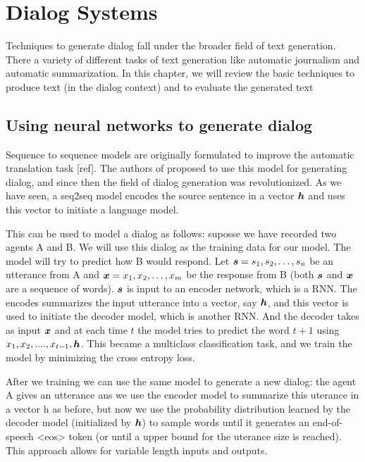 \chapter{Dialog Systems}
\label{ch:03-dialog-systems}

Techniques to generate dialog fall under the broader field of text generation. There a variety of different tasks of text generation like automatic journalism and automatic summarization. In this chapter, we will review the basic techniques to produce text (in the dialog context) and to evaluate the generated text


\section{Using neural networks to generate dialog}
\label{ch:03-gen}

Sequence to sequence models are originally formulated to improve the automatic translation task [ref]. The authors of \cite{DBLP:journals/corr/VinyalsL15} proposed to use this model for generating dialog, and since then the field of dialog generation was revolutionized. As we have seen, a seq2seq model encodes the source sentence in a vector $\bm{h}$ and uses this vector to initiate a language model.

This can be used to model a dialog as follows: suposse we have recorded two agents A and B. We will use this dialog as the training data for our model. The model will try to predict how B would respond. Let $\bm{s} = s_1, s_2, \dots, s_n$ be an utterance from A and  $\bm{x} = x_1, x_2, \dots, x_m$ be the response from B (both $\bm{s}$ and $\bm{x}$ are a sequence of words). $\bm{s}$ is input to an encoder network, which is a RNN. The encodes summarizes the input utterance into a vector, say $\bm{h}$, and this vector is used to initiate the decoder model, which is another RNN. And the decoder takes as input $\bm{x}$ and at each time $t$ the model tries to predict the word $t+1$ using $x_1, x_2, ...., x_{t-1}, \bm{h}$. This became a multiclass classification task, and we train the model by minimizing the cross entropy loss.


After we training we can use the same model to generate a new dialog: the agent A gives an utterance ans we use the encoder model to summarize this uterance in a vector h as before, but now we use the probability distribution learned by the decoder model (initialized by $\bm{h}$) to sample words until it generates an end-of-speech <eos> token (or until a upper bound for the uterance size is reached). This approach allows for variable length inputs and outputs.

